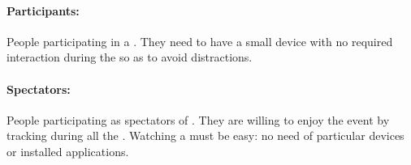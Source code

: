 \documentclass[../../rasd.tex]{subfiles}
\begin{document}
\paragraph{Participants:}
	People participating in a . They need to have a small device with no required interaction during the  so as to avoid distractions.

\paragraph{Spectators:}
	People participating as spectators of . They are willing to enjoy the event by tracking  during all the . Watching a  must be easy: no need of particular devices or installed applications.
\end{document}

